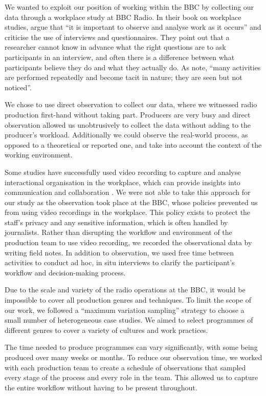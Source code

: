 We wanted to exploit our position of working within the BBC by collecting our data through a workplace study at BBC
Radio.  In their book on workplace studies, \citet{Luff2000} argue that ``it is important to observe and analyse work
as it occurs'' and criticise the use of interviews and questionnaires. They point out that a researcher cannot know in
advance what the right questions are to ask participants in an interview, and often there is a difference between what
participants believe they do and what they actually do. As \citet[p.~245]{Luff2000} note, ``many activities are
performed repeatedly and become tacit in nature; they are seen but not noticed''.

We chose to use direct observation to collect our data, where we witnessed radio production first-hand without taking
part.  Producers are very busy and direct observation allowed us unobtrusively to collect the data without adding to
the producer's workload. Additionally we could observe the real-world process, as opposed to a theoretical or reported
one, and take into account the context of the working environment.

Some studies have successfully used video recording to capture and analyse interactional organisation in the workplace,
which can provide insights into communication and collaboration \citep[p.~16]{Luff2000}.  We were not able to take this
approach for our study as the observation took place at the BBC, whose policies prevented us from using video
recordings in the workplace.  This policy exists to protect the staff's privacy and any sensitive information, which is
often handled by journalists.  Rather than disrupting the workflow and environment of the production team to use video
recording, we recorded the observational data by writing field notes.  In addition to observation, we used free time
between activities to conduct ad hoc, in situ interviews to clarify the participant's workflow and decision-making
process.

Due to the scale and variety of the radio operations at the BBC, it would be impossible to cover all production genres
and techniques. To limit the scope of our work, we followed a ``maximum variation sampling'' strategy \citep[p.
172]{Patton1990} to choose a small number of heterogeneous case studies. We aimed to select programmes of different
genres to cover a variety of cultures and work practices.

The time needed to produce programmes can vary significantly, with some being produced over many weeks or months. To
reduce our observation time, we worked with each production team to create a schedule of observations that sampled
every stage of the process and every role in the team. This allowed us to capture the entire workflow without having to
be present throughout.

